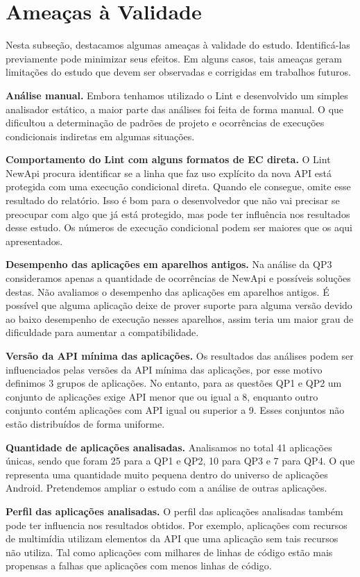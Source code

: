 \section{Ameaças à Validade} \label{sec:ameacas}

Nesta subseção, destacamos algumas ameaças à validade do estudo. Identificá-las
previamente pode minimizar seus efeitos.  Em alguns casos, tais ameaças geram
limitações do estudo que devem ser observadas e corrigidas em trabalhos futuros.

\textbf{Análise manual.} Embora tenhamos utilizado o Lint e desenvolvido um simples
analisador estático, a maior parte das análises foi feita de forma manual. O que
dificultou a determinação de padrões de projeto e ocorrências de execuções condicionais
indiretas em algumas situações.

\textbf{Comportamento do Lint com alguns formatos de EC direta.} O Lint NewApi procura
identificar se a linha que faz uso explícito da nova API está protegida com uma execução
condicional direta. Quando ele consegue, omite esse resultado do relatório. Isso é bom
para o desenvolvedor que não vai precisar se preocupar com algo que já está protegido,
mas pode ter influência nos resultados desse estudo. Os números de execução condicional
podem ser maiores que os aqui apresentados.

\textbf{Desempenho das aplicações em aparelhos antigos.} Na análise da QP3
consideramos apenas a quantidade de ocorrências de NewApi e possíveis soluções
destas. Não avaliamos o desempenho das aplicações em aparelhos antigos. É possível
que alguma aplicação deixe de prover suporte para alguma versão devido ao baixo
desempenho de execução nesses aparelhos, assim teria um maior grau de dificuldade
para aumentar a compatibilidade.

\textbf{Versão da API mínima das aplicações.} Os resultados das análises podem ser
influenciados pelas versões da API mínima das aplicações, por esse motivo definimos
3 grupos de aplicações. No entanto, para as questões QP1 e QP2 um conjunto de aplicações
exige API menor que ou igual a 8, enquanto outro conjunto contém aplicações com API igual
ou superior a 9. Esses conjuntos não estão distribuídos de forma uniforme.

\textbf{Quantidade de aplicações analisadas.} Analisamos no total 41 aplicações únicas,
sendo que foram 25 para a QP1 e QP2, 10 para QP3 e 7 para QP4. O que representa uma
quantidade muito pequena dentro do universo de aplicações Android. Pretendemos ampliar
o estudo com a análise de outras aplicações.

\textbf{Perfil das aplicações analisadas.} O perfil das aplicações analisadas também
pode ter influencia nos resultados obtidos. Por exemplo, aplicações com recursos de
multimídia utilizam elementos da API que uma aplicação sem tais recursos não utiliza.
Tal como aplicações com milhares de linhas de código estão mais propensas a falhas
que aplicações com menos linhas de código.

